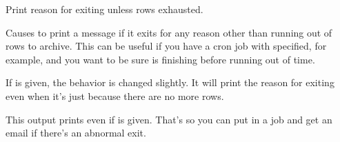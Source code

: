 \documentclass[letterpaper,10pt,english]{sphinxmanual}
\begin{document}

\begin{fulllineitems}
\label{\detokenize{mariadb-archiver:cmdoption-mariadb-archiver-why-quit}}
Print reason for exiting unless rows exhausted.

Causes  to print a message if it exits for any reason other than
running out of rows to archive.  This can be useful if you have a cron job with
{\hyperref[\detokenize{mariadb-archiver:cmdoption-mariadb-archiver-run-time}]{}} specified, for example, and you want to be sure  is
finishing before running out of time.

If {\hyperref[\detokenize{mariadb-archiver:cmdoption-mariadb-archiver-statistics}]{}} is given, the behavior is changed slightly.  It will print
the reason for exiting even when it’s just because there are no more rows.

This output prints even if {\hyperref[\detokenize{mariadb-archiver:cmdoption-mariadb-archiver-quiet}]{}} is given.  That’s so you can put
 in a  job and get an email if there’s an abnormal exit.

\end{fulllineitems}
\end{document}
